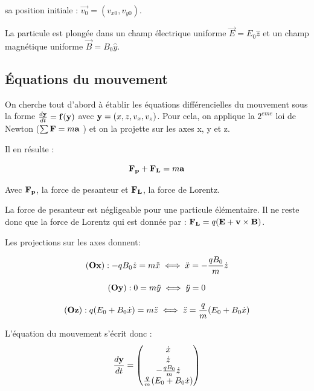 \documentclass[a4paper,12pt,twoside]{article}
\begin{document}
	\noindent sa position initiale : $\vec{v_0} = (v_{x0}, v_{y0})$.
	
	\noindent La particule est plongée dans un champ \'electrique uniforme $\vec{E} = E_0 \hat{z}$ et un champ magn\'etique uniforme $\vec{B} = B_0 \hat{y}$. 


	\subsection{\'Equations du mouvement}
	
		\noindent On cherche tout d'abord \`a \'etablir les \'equations diff\'erencielles du mouvement sous la forme $\frac{d\bf y}{dt} = {\bf f(\bf{y}})$ avec ${\bf y} = (x, z, v_x, v_z)$. 
		Pour cela, on applique la $2^{eme}$ loi de Newton ($\sum{\bf F} = m \bf a$ ) et on la projette sur les axes x, y et z.
		
		\noindent Il en r\'esulte :
		
		\begin{equation}
			{\bf F_p  + F_L} = m \bf{a}
		\end{equation}
		
		\noindent Avec ${\bf F_p}$, la force de pesanteur et ${\bf F_L}$, la force de Lorentz.
		
		\noindent La force de pesanteur est n\'egligeable pour une particule \'el\'ementaire. Il ne reste donc que la force de Lorentz qui est donn\'ee par : ${\bf F_L} = q({\bf E}+{\bf v} \times {\bf B})$.
		
		\noindent Les projections sur les axes donnent:
		
		\begin{equation}\label{xpp}
			{\bf(Ox)}: -qB_0 \dot{z} = m \ddot{x}  \iff \ddot{x} = -\frac{qB_0}{m} \dot{z}
		\end{equation}
		
		\begin{equation}
			{\bf(Oy)}:  0 = m \ddot{y} \iff \ddot{y} = 0
		\end{equation}
		
		\begin{equation}\label{zpp}
			{\bf(Oz)}:  q(E_0 + B_0\dot{x}) = m \ddot{z} \iff \ddot{z} = \frac{q}{m} (E_0+B_0 \dot{x}) 
		\end{equation}
		
	\noindent	L'\'equation du mouvement s'\'ecrit donc :
		\begin{equation}
		\frac{d\bf y}{dt} = \begin{pmatrix}  \dot x \\ \dot z \\ -\frac{qB_0}{m} \dot{z} \\ \frac{q}{m} (E_0+B_0 \dot{x}) \end{pmatrix}
		\end{equation}
		
\end{document}
